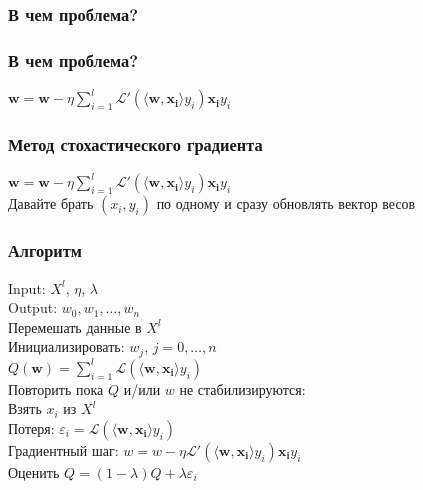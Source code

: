 \documentclass[12pt]{beamer}
\begin{document}
\begin{frame}\frametitle{В чем проблема?}

\end{frame}

\begin{frame}\frametitle{В чем проблема?}
$\mathbf{w} =  \mathbf{w} - \eta \sum\limits_{i=1}^l \mathcal{L}'(\langle \mathbf{w}, \mathbf{x_i} \rangle y_i)\mathbf{x_i}y_i$\\
\vspace{5mm}
\end{frame}

\begin{frame}\frametitle{Метод стохастического градиента}
$\mathbf{w} =  \mathbf{w} - \eta \sum\limits_{i=1}^l \mathcal{L}'(\langle \mathbf{w}, \mathbf{x_i}\rangle y_i)\mathbf{x_i}y_i$\\
\vspace{5mm}
Давайте брать $(x_i, y_i)$ по одному и сразу обновлять вектор весов
\end{frame}


\begin{frame}\frametitle{Алгоритм}
Input: $X^l$, $\eta$, $\lambda$\\
Output: $w_0, w_1, \dots, w_n$\\
\vspace{3mm}
Перемешать данные в $X^l$\\
Инициализировать: $w_j$, $j=0,\dots, n$\\
\hspace{35mm} ${Q}(\mathbf{w}) = \sum\limits_{i=1}^l \mathcal{L}(\langle \mathbf{w}, \mathbf{x_i} \rangle y_i)$\\
Повторить пока $Q$ и/или $w$ не стабилизируются:\\
\hspace{5mm} Взять $x_i$ из $X^l$ \\
\hspace{5mm} Потеря: $\varepsilon_i = \mathcal{L}(\langle \mathbf{w}, \mathbf{x_i} \rangle y_i)$\\
\hspace{5mm} Градиентный шаг: $w =  w - \eta \mathcal{L}'(\langle \mathbf{w}, \mathbf{x_i}\rangle y_i)\mathbf{x_i}y_i$\\
\hspace{5mm} Оценить $Q = (1-\lambda)Q + \lambda \varepsilon_i$
\end{frame}
\end{document}
